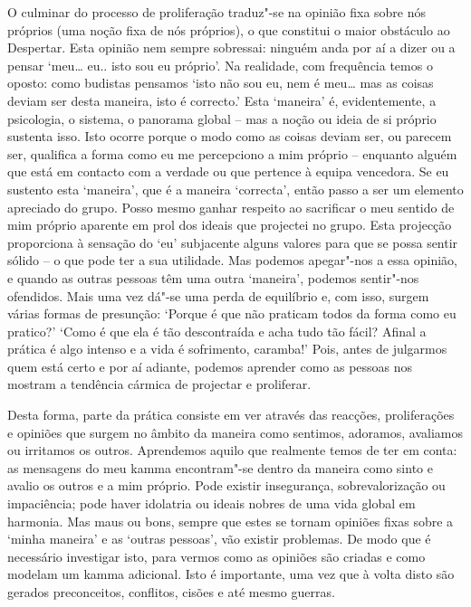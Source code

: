 O culminar do processo de proliferação traduz"-se na opinião fixa sobre nós
próprios (uma noção fixa de nós próprios), o que constitui o maior obstáculo ao
Despertar. Esta opinião nem sempre sobressai: ninguém anda por aí a dizer ou a
pensar `meu\ldots{} eu.. isto sou eu próprio'. Na realidade, com frequência
temos o oposto: como budistas pensamos `isto não sou eu, nem é meu\ldots{} mas
as coisas deviam ser desta maneira, isto é correcto.' Esta `maneira' é,
evidentemente, a psicologia, o sistema, o panorama global -- mas a noção ou
ideia de si próprio sustenta isso. Isto ocorre porque o modo como as coisas
deviam ser, ou parecem ser, qualifica a forma como eu me percepciono a mim
próprio -- enquanto alguém que está em contacto com a verdade ou que pertence à
equipa vencedora. Se eu sustento esta `maneira', que é a maneira `correcta',
então passo a ser um elemento apreciado do grupo. Posso mesmo ganhar respeito ao
sacrificar o meu sentido de mim próprio aparente em prol dos ideais que
projectei no grupo. Esta projecção proporciona à sensação do `eu' subjacente
alguns valores para que se possa sentir sólido -- o que pode ter a sua
utilidade. Mas podemos apegar"-nos a essa opinião, e quando as outras pessoas
têm uma outra `maneira', podemos sentir"-nos ofendidos. Mais uma vez dá"-se uma
perda de equilíbrio e, com isso, surgem várias formas de presunção: `Porque é
que não praticam todos da forma como eu pratico?' `Como é que ela é tão
descontraída e acha tudo tão fácil? Afinal a prática é algo intenso e a vida é
sofrimento, caramba!' Pois, antes de julgarmos quem está certo e por aí adiante,
podemos aprender como as pessoas nos mostram a tendência cármica de projectar e
proliferar.

Desta forma, parte da prática consiste em ver através das reacções,
proliferações e opiniões que surgem no âmbito da maneira como sentimos,
adoramos, avaliamos ou irritamos os outros. Aprendemos aquilo que realmente
temos de ter em conta: as mensagens do meu kamma encontram"-se dentro da maneira
como sinto e avalio os outros e a mim próprio. Pode existir insegurança,
sobrevalorização ou impaciência; pode haver idolatria ou ideais nobres de uma
vida global em harmonia. Mas maus ou bons, sempre que estes se tornam opiniões
fixas sobre a `minha maneira' e as `outras pessoas', vão existir problemas. De
modo que é necessário investigar isto, para vermos como as opiniões são criadas
e como modelam um kamma adicional. Isto é importante, uma vez que à volta disto
são gerados preconceitos, conflitos, cisões e até mesmo guerras.

